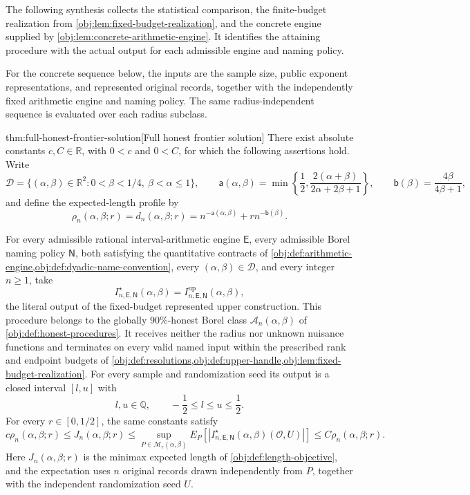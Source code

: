 The following synthesis collects the statistical comparison, the finite-budget realization from \cref{obj:lem:fixed-budget-realization}, and the concrete engine supplied by \cref{obj:lem:concrete-arithmetic-engine}. It identifies the attaining procedure with the actual output for each admissible engine and naming policy.

For the concrete sequence below, the inputs are the sample size, public exponent representations, and represented original records, together with the independently fixed arithmetic engine and naming policy. The same radius-independent sequence is evaluated over each radius subclass.

\begin{theoremv}{thm:full-honest-frontier-solution}[Full honest frontier solution]
There exist absolute constants \(c,C\in\mathbb R\), with \(0<c\) and \(0<C\), for which the following assertions hold. Write
\[
\mathcal D=\{(\alpha,\beta)\in\mathbb R^2:0<\beta<1/4,\ \beta<\alpha\le1\},
\qquad
\mathsf a(\alpha,\beta)=
\min\left\{\frac12,\frac{2(\alpha+\beta)}{2\alpha+2\beta+1}\right\},
\qquad
\mathsf b(\beta)=\frac{4\beta}{4\beta+1},
\]
and define the expected-length profile by
\[
\rho_n(\alpha,\beta;r)
=d_n(\alpha,\beta;r)
=n^{-\mathsf a(\alpha,\beta)}
+r n^{-\mathsf b(\beta)}.
\]

For every admissible rational interval-arithmetic engine \(\mathsf E\), every admissible Borel naming policy \(\mathsf N\), both satisfying the quantitative contracts of \cref{obj:def:arithmetic-engine,obj:def:dyadic-name-convention}, every \((\alpha,\beta)\in\mathcal D\), and every integer \(n\ge1\), take
\[
I^\star_{n,\mathsf E,\mathsf N}(\alpha,\beta)
=I^{\mathrm{up}}_{n,\mathsf E,\mathsf N}(\alpha,\beta),
\]
the literal output of the fixed-budget represented upper construction. This procedure belongs to the globally \(90\%\)-honest Borel class \(\mathcal A_n(\alpha,\beta)\) of \cref{obj:def:honest-procedures}. It receives neither the radius nor unknown nuisance functions and terminates on every valid named input within the prescribed rank and endpoint budgets of \cref{obj:def:resolutions,obj:def:upper-handle,obj:lem:fixed-budget-realization}. For every sample and randomization seed its output is a closed interval \([l,u]\) with
\[
l,u\in\mathbb Q,
\qquad -\frac12\le l\le u\le\frac12.
\]
For every \(r\in[0,1/2]\), the same constants satisfy
\[
c\rho_n(\alpha,\beta;r)
\le J_n(\alpha,\beta;r)
\le
\sup_{P\in\mathcal M_r(\alpha,\beta)}
E_P\!\left[
\left|I^\star_{n,\mathsf E,\mathsf N}(\alpha,\beta)(\mathcal O,U)\right|
\right]
\le C\rho_n(\alpha,\beta;r).
\]
Here \(J_n(\alpha,\beta;r)\) is the minimax expected length of \cref{obj:def:length-objective}, and the expectation uses \(n\) original records drawn independently from \(P\), together with the independent randomization seed \(U\).


\end{theoremv}
